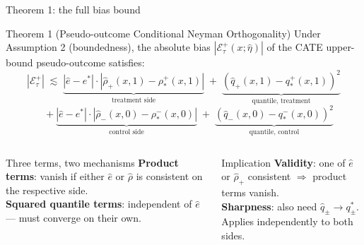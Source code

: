 \documentclass[aspectratio=169]{beamer}
\begin{document}
\begin{frame}{Theorem 1: the full bias bound}

\begin{block}{Theorem 1 (Pseudo-outcome Conditional Neyman Orthogonality)}
Under Assumption 2 (boundedness), the absolute bias $|\mathcal{E}^+_\tau(x;\hat\eta)|$ of the CATE upper-bound pseudo-outcome satisfies:
\[
  |\mathcal{E}^+_\tau| \;\lesssim\;
  \underbrace{|\hat e - e^*|\cdot|\hat\rho_+(x,1) - \rho^+_*(x,1)|}_{\text{treatment side}}
  \;+\;
  \underbrace{(\hat q_+(x,1) - q^+_*(x,1))^2}_{\text{quantile, treatment}}
\]
\[
  \quad + \underbrace{|\hat e - e^*|\cdot|\hat\rho_-(x,0) - \rho^-_*(x,0)|}_{\text{control side}}
  \;+\;
  \underbrace{(\hat q_-(x,0) - q^-_*(x,0))^2}_{\text{quantile, control}}
\]
\end{block}

\smallskip
\begin{columns}
\begin{alertblock}{Three terms, two mechanisms}
\small \textbf{Product terms}: vanish if either $\hat e$ or $\hat\rho$ is consistent on the respective side.\\
\textbf{Squared quantile terms}: independent of $\hat e$ --- must converge on their own.
\end{alertblock}
\begin{block}{Implication}
\small \textbf{Validity}: one of $\hat e$ or $\hat\rho_+$ consistent $\Rightarrow$ product terms vanish.\\
\textbf{Sharpness}: also need $\hat q_\pm \to q^*_\pm$.\\
Applies independently to both sides.
\end{block}
\end{columns}
\end{frame}

\end{document}
